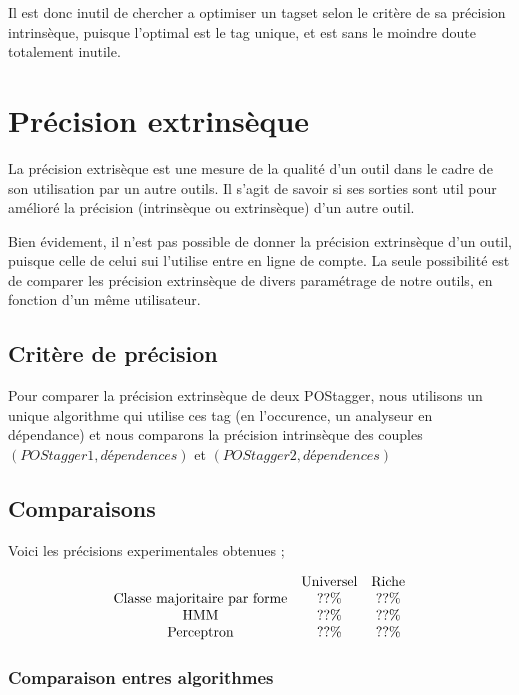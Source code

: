 \documentclass{article}
\begin{document}
Il est donc inutil de chercher a optimiser un tagset selon le critère de sa précision intrinsèque, puisque l'optimal est le tag unique, et est sans le moindre doute totalement inutile.

\section{Précision extrinsèque}

La précision extrisèque est une mesure de la qualité d'un outil dans le cadre de son utilisation par un autre outils. Il s'agit de savoir si ses sorties sont util pour amélioré la précision (intrinsèque ou extrinsèque) d'un autre outil.

Bien évidement, il n'est pas possible de donner la précision extrinsèque d'un outil, puisque celle de celui sui l'utilise entre en ligne de compte. La seule possibilité est de comparer les précision extrinsèque de divers paramétrage de notre outils, en fonction d'un même utilisateur.

\subsection{Critère de précision}

Pour comparer la précision extrinsèque de deux POStagger, nous utilisons un unique algorithme qui utilise ces tag (en l'occurence, un analyseur en dépendance) et nous comparons la précision intrinsèque des couples $(POStagger1,dépendences)$ et $(POStagger2,dépendences)$

\subsection{Comparaisons}

Voici les précisions experimentales obtenues ;

$$
\begin{array}{c c c}
&\text{Universel}&\text{Riche}\\
\text{Classe majoritaire par forme}&??\%&??\%\\
\text{HMM}&??\%&??\%\\
\text{Perceptron}&??\%&??\%\\
\end{array}
$$

\subsubsection{Comparaison entres algorithmes}
\end{document}
